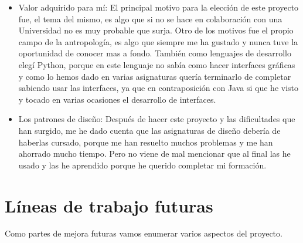 \begin{itemize}
\item Valor adquirido para mí: 
El principal motivo para la elección de este proyecto fue, el tema del mismo, es algo que si no se hace en colaboración con una Universidad no es muy probable que surja. Otro de los motivos fue el propio campo de la antropología, es algo que siempre me ha gustado y nunca tuve la oportunidad de conocer mas a fondo.
También como lenguajes de desarrollo elegí Python, porque en este lenguaje no sabía como hacer interfaces gráficas y como lo hemos dado en varias asignaturas quería terminarlo de completar sabiendo usar las interfaces, ya que en contraposición con Java si que he visto y tocado en varias ocasiones el desarrollo de interfaces.

\item Los patrones de diseño:
Después de hacer este proyecto y las dificultades que han surgido, me he dado cuenta que las asignaturas de diseño debería de haberlas cursado, porque me han resuelto muchos problemas y me han ahorrado mucho tiempo.
Pero no viene de mal mencionar que al final las he usado y las he aprendido porque he querido completar mi formación.

\end{itemize}



\section{Líneas de trabajo futuras}
Como partes de mejora futuras vamos enumerar varios aspectos del proyecto.

